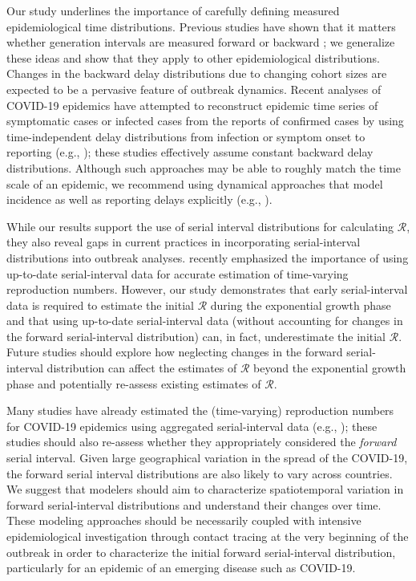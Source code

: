 \documentclass[12pt]{article}
\newcommand{\RR}{\ensuremath{{\mathcal R}}\xspace}
\begin{document}
Our study underlines the importance of carefully defining measured epidemiological time distributions.
Previous studies have shown that it matters whether generation
intervals are measured forward or backward \citep{nishiura2010time,champredon2015intrinsic,britton2019estimation};
we generalize these ideas and show that they apply to other epidemiological distributions.
Changes in the backward delay distributions due to changing cohort sizes are expected to be a pervasive feature of outbreak dynamics.
Recent analyses of COVID-19 epidemics have attempted to reconstruct epidemic time series of symptomatic cases or infected cases from the reports of confirmed cases by using time-independent delay distributions from infection or symptom onset to reporting (e.g., \cite{tempvar, park2020potential,scire2020reproductive,shim2020transmission});
these studies effectively assume constant backward delay distributions.
Although such approaches may be able to roughly match the time scale of an epidemic, we recommend using dynamical approaches that model incidence as well as reporting delays explicitly (e.g., \cite{flaxman2020estimating}).

While our results support the use of serial interval distributions for calculating \RR, 
they also reveal gaps in current practices in incorporating serial-interval distributions into outbreak analyses.
\cite{thompson2019improved} recently emphasized the importance of using up-to-date serial-interval data for accurate estimation of time-varying reproduction numbers.
However, our study demonstrates that early serial-interval data is required to estimate the initial \RR during the exponential growth phase and that using up-to-date serial-interval data (without accounting for changes in the forward serial-interval distribution) can, in fact, underestimate the initial \RR.
Future studies should explore how neglecting changes in the forward serial-interval distribution can affect the estimates of \RR beyond the exponential growth phase and potentially re-assess existing estimates of \RR.

Many studies have already estimated the (time-varying) reproduction numbers for COVID-19 epidemics using aggregated serial-interval data (e.g., \cite{tempvar,du2020serial,pan2020jama,zhang2020evolving});
these studies should also re-assess whether they appropriately considered the \emph{forward} serial interval.
Given large geographical variation in the spread of the COVID-19, the forward serial interval distributions are also likely to vary across countries.
We suggest that modelers should aim to characterize spatiotemporal variation in forward serial-interval distributions and understand their changes over time.
These modeling approaches should be necessarily coupled with intensive
epidemiological investigation through contact tracing at the very
beginning of the outbreak in order to characterize the initial forward
serial-interval distribution, particularly for an epidemic of an
emerging disease such as COVID-19.
\end{document}
